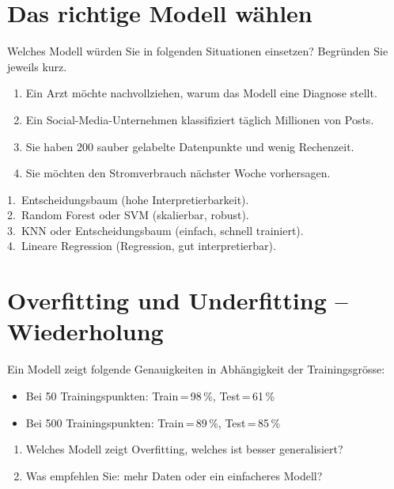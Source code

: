 \section{Das richtige Modell wählen}

\begin{myexercise}
Welches Modell würden Sie in folgenden Situationen einsetzen?
Begründen Sie jeweils kurz.
\begin{enumerate}
    \item Ein Arzt möchte nachvollziehen, warum das Modell eine Diagnose stellt.
    \item Ein Social-Media-Unternehmen klassifiziert täglich Millionen von Posts.
    \item Sie haben 200 sauber gelabelte Datenpunkte und wenig Rechenzeit.
    \item Sie möchten den Stromverbrauch nächster Woche vorhersagen.
\end{enumerate}
\begin{myanswer}
1.\ Entscheidungsbaum (hohe Interpretierbarkeit). \\
2.\ Random Forest oder SVM (skalierbar, robust). \\
3.\ KNN oder Entscheidungsbaum (einfach, schnell trainiert). \\
4.\ Lineare Regression (Regression, gut interpretierbar).
\end{myanswer}
\end{myexercise}

\section{Overfitting und Underfitting -- Wiederholung}

\begin{myexercise}
Ein Modell zeigt folgende Genauigkeiten in Abhängigkeit der Trainingsgrösse:
\begin{itemize}
    \item Bei 50 Trainingspunkten: Train\,=\,98\,\%, Test\,=\,61\,\%
    \item Bei 500 Trainingspunkten: Train\,=\,89\,\%, Test\,=\,85\,\%
\end{itemize}
\begin{enumerate}
    \item Welches Modell zeigt Overfitting, welches ist besser generalisiert?
    \item Was empfehlen Sie: mehr Daten oder ein einfacheres Modell?
\end{enumerate}
\end{myexercise}


